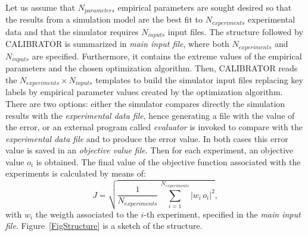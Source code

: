\documentclass[review,authoryear]{elsarticle}
\newcommand{\EQ}[2]
{\begin{equation}#1\label{#2}\end{equation}}
\newcommand{\PSPICTURE}[7]
{
	\begin{figure}[ht!]
		\centering
		\pspicture(#1,#2)(#3,#4)
			#5
		\endpspicture
		\caption{#6.\label{#7}}
	\end{figure}
}
\newcommand{\ABS}[1]{\left|#1\right|}
\begin{document}
Let us assume that $N_{parameters}$ empirical parameters are sought desired so
that the results from a simulation model are the best fit to $N_{experiments}$
experimental data and that the simulator requires $N_{inputs}$ input files. The
structure followed by CALIBRATOR is summarized in \emph{main input file},
where both $N_{experiments}$ and $N_{inputs}$ are specified. Furthermore, it
contains the extreme values of the empirical parameters and the chosen
optimization algorithm. Then, CALIBRATOR reads the
$N_{experiments}\times N_{inputs}$ templates to build the simulator input files
replacing key labels by empirical parameter values created by the optimization
algorithm. There are two options: either the simulator compares directly the
simulation results with the \emph{experimental data file}, hence generating a
file with the value of the error, or an external program called \emph{evaluator}
is invoked to compare with the \emph{experimental data file} and to produce the
error value. In both cases this error value is saved in an
\emph{objective value file}. Then for each experiment, an objective value $o_i$
is obtained. The final value of the objective function associated with the
experiments is calculated by means of:
\EQ
{
	J=\sqrt{\frac{1}{N_{experiments}}
	\,\sum_{i=1}^{N_{experiments}}\ABS{w_i\,o_i}^2},
}{EqObjectiveFunction}
with $w_i$ the weigth associated to the $i$-th experiment, specified in the
\emph{main input file}. Figure~\ref{FigStructure} is a sketch of the
structure.
\end{document}
